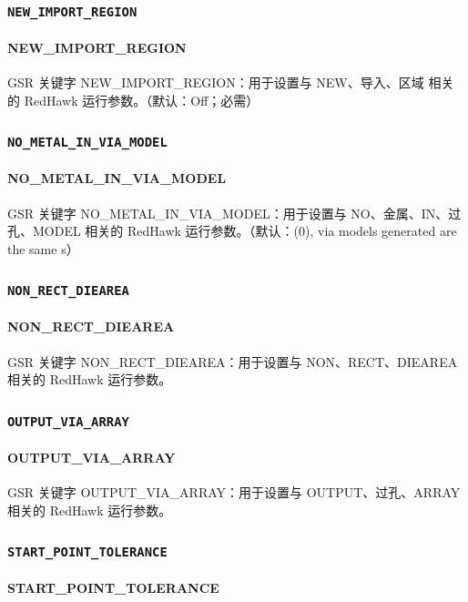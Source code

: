 \subsubsection{\texttt{NEW_IMPORT_REGION}}
\paragraph*{NEW_IMPORT_REGION}

GSR 关键字 NEW_IMPORT_REGION：用于设置与 NEW、导入、区域 相关的 RedHawk 运行参数。（默认：Off；必需）

\subsubsection{\texttt{NO_METAL_IN_VIA_MODEL}}
\paragraph*{NO_METAL_IN_VIA_MODEL}

GSR 关键字 NO_METAL_IN_VIA_MODEL：用于设置与 NO、金属、IN、过孔、MODEL 相关的 RedHawk 运行参数。（默认：(0), via models generated are the same s）

\subsubsection{\texttt{NON_RECT_DIEAREA}}
\paragraph*{NON_RECT_DIEAREA}

GSR 关键字 NON_RECT_DIEAREA：用于设置与 NON、RECT、DIEAREA 相关的 RedHawk 运行参数。

\subsubsection{\texttt{OUTPUT_VIA_ARRAY}}
\paragraph*{OUTPUT_VIA_ARRAY}

GSR 关键字 OUTPUT_VIA_ARRAY：用于设置与 OUTPUT、过孔、ARRAY 相关的 RedHawk 运行参数。

\subsubsection{\texttt{START_POINT_TOLERANCE}}
\paragraph*{START_POINT_TOLERANCE}


